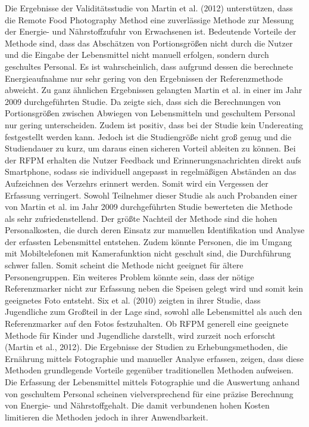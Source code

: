 Die Ergebnisse der Validitätsstudie von Martin et al. (2012) unterstützen, dass die Remote Food Photography Method eine zuverlässige Methode zur Messung der Energie- und Nährstoffzufuhr von Erwachsenen ist. Bedeutende Vorteile der Methode sind, dass das Abschätzen von Portionsgrößen nicht durch die Nutzer und die Eingabe der Lebensmittel nicht manuell erfolgen, sondern durch geschultes Personal. Es ist wahrscheinlich, dass aufgrund dessen die berechnete Energieaufnahme nur sehr gering von den Ergebnissen der Referenzmethode abweicht. Zu ganz ähnlichen Ergebnissen  gelangten Martin et al. in einer im Jahr 2009 durchgeführten Studie. Da zeigte sich, dass sich die Berechnungen von Portionsgrößen zwischen Abwiegen von Lebensmitteln und geschultem Personal nur gering unterscheiden. Zudem ist positiv, dass bei der Studie kein Undereating festgestellt werden kann. Jedoch ist die Studiengröße nicht groß genug und die Studiendauer zu kurz, um daraus einen sicheren Vorteil ableiten zu können. Bei der RFPM erhalten die Nutzer Feedback und Erinnerungsnachrichten direkt aufs Smartphone, sodass sie individuell angepasst in regelmäßigen Abständen an das Aufzeichnen des Verzehrs erinnert werden. Somit wird ein Vergessen der Erfassung verringert. Sowohl Teilnehmer dieser Studie als auch Probanden einer von Martin et al. im Jahr 2009 durchgeführten Studie bewerteten die Methode als sehr zufriedenstellend. Der größte Nachteil der Methode sind die hohen Personalkosten, die durch deren Einsatz zur manuellen Identifikation und Analyse der erfassten Lebensmittel entstehen. Zudem könnte Personen, die im Umgang mit Mobiltelefonen mit Kamerafunktion nicht geschult sind, die Durchführung schwer fallen. Somit scheint die Methode nicht geeignet für ältere Personengruppen. Ein weiteres Problem könnte sein, dass der nötige Referenzmarker nicht zur Erfassung neben die Speisen gelegt wird und somit kein geeignetes Foto entsteht. Six et al. (2010) zeigten in ihrer Studie, dass Jugendliche zum Großteil in der Lage sind, sowohl alle Lebensmittel als auch den Referenzmarker auf den Fotos festzuhalten. Ob RFPM generell eine geeignete Methode für Kinder und Jugendliche darstellt, wird zurzeit noch erforscht (Martin et al., 2012).
Die Ergebnisse der Studien zu Erhebungsmethoden, die Ernährung mittels Fotographie und manueller Analyse erfassen, zeigen, dass diese Methoden grundlegende Vorteile gegenüber traditionellen Methoden aufweisen. Die Erfassung der Lebensmittel mittels Fotographie und die Auswertung anhand von geschultem Personal scheinen vielversprechend für eine präzise Berechnung von Energie- und Nährstoffgehalt. Die damit verbundenen hohen Kosten limitieren die Methoden jedoch in ihrer Anwendbarkeit. 




